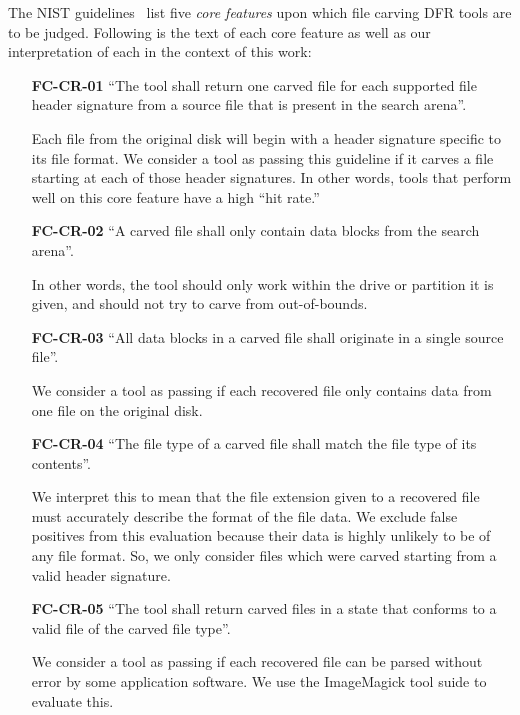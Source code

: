 \begin{paraphrase}
 The NIST guidelines~\cite{carving_standards} list five \emph{core features} upon which file carving DFR tools are to be judged.
Following is the text of each core feature as well as our interpretation of each in the context of this work:
\end{paraphrase}
\begin{itemize}
 \item[\textbf{FC-CR-01}] ``The tool shall return one carved file for each supported file header signature from a source file that is present in the search arena''.~\cite{carving_standards}
 
 Each file from the original disk will begin with a header signature specific to its file format. We consider a tool as passing this guideline if it carves a file starting at each of those header signatures.
 In other words, tools that perform well on this core feature have a high ``hit rate.''
 
 \item[\textbf{FC-CR-02}] ``A carved file shall only contain data blocks from the search arena''.~\cite{carving_standards}
 
 In other words, the tool should only work within the drive or partition it is given, and should not try to carve from out-of-bounds.
 
 \item[\textbf{FC-CR-03}] ``All data blocks in a carved file shall originate in a single source file''.~\cite{carving_standards}
 
We consider a tool as passing if each recovered file only contains data from one file on the original disk.
 
 \item[\textbf{FC-CR-04}] ``The file type of a carved file shall match the file type of its contents''.~\cite{carving_standards}
 
 We interpret this to mean that the file extension given to a recovered file must accurately describe the format of the file data. We exclude false positives from this evaluation because their data is highly unlikely to be of any file format. So, we only consider files which were carved starting from a valid header signature.
 
 \item[\textbf{FC-CR-05}] ``The tool shall return carved files in a state that conforms to a valid file of the carved file type''.~\cite{carving_standards}
 
 We consider a tool as passing if each recovered file can be parsed without error by some application software.
 We use the ImageMagick tool suide to evaluate this.
\end{itemize}
